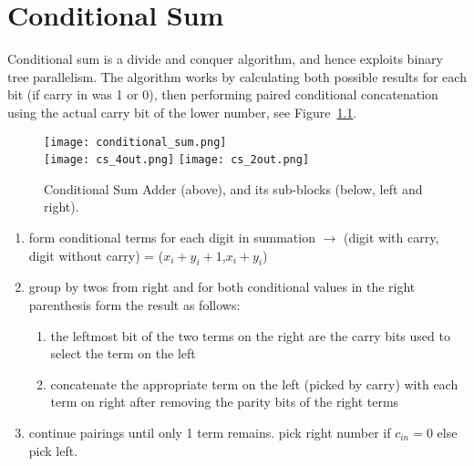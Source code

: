 \chapter{Conditional Sum}

Conditional sum is a divide and conquer algorithm, and hence exploits binary tree parallelism.  The algorithm works by calculating both possible results for each bit (if carry in was 1 or 0), then performing paired conditional concatenation using the actual carry bit of the lower number, see Figure~\ref{f-cond_sum_add}.

\begin{figure}
\caption{Conditional Sum Adder (above), and its sub-blocks (below, left and right).}\label{f-cond_sum_add}
\begin{center}
\texttt{[image: conditional\_sum.png]}\\\vspace{.2in}
\texttt{[image: cs\_4out.png]} \hspace{.2in} \texttt{[image: cs\_2out.png]}
\end{center}
\end{figure}

\begin{enumerate}
    \item form conditional terms for each digit in summation $\rightarrow$ (digit with carry, digit without carry) = ($x_i+y_i+1$,$x_i+y_i$)
    \item group by twos from right and for both conditional values in the right parenthesis form the result as follows:
    \begin{enumerate}
        \item the leftmost bit of the two terms on the right are the carry bits used to select the term on the left
        \item concatenate the appropriate term on the left (picked by carry) with each term on right after removing the parity bits of the right terms
    \end{enumerate}
    \item continue pairings until only 1 term remains. pick right number if $c_{in}=0$ else pick left.
\end{enumerate}

